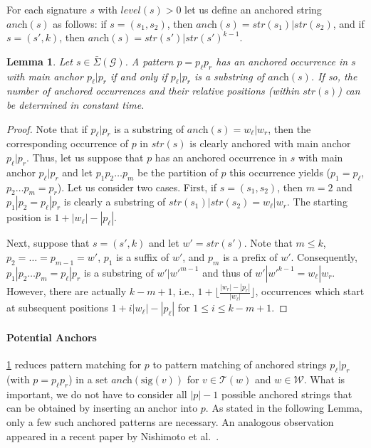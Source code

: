 \documentclass[a4paper]{article}
\newtheorem{lemma}[theorem]{Lemma}
\theoremstyle{remark}
\newcommand{\sigs}{\bar{\Sigma}}
\newcommand{\grammar}{\mathcal{G}}
\newcommand{\slev}{\textit{level}}
\newcommand{\sanch}{\textit{anch}}
\newcommand{\stree}{\mathcal{T}}
\newcommand{\sstr}{\textit{str}}
\newcommand{\ussig}{\mathrm{sig}}
\newcommand{\coll}{\mathcal{W}}
\begin{document}
For each signature $s$ with $\slev(s)>0$ let us define an anchored string $\sanch(s)$ as follows:
if $s=(s_1,s_2)$, then $\sanch(s)=\sstr(s_1)|\sstr(s_2)$, and if $s=(s',k)$, then $\sanch(s)=\sstr(s')|\sstr(s')^{k-1}$.
\begin{lemma}\label{lem:relanch}
  Let $s\in \sigs(\grammar)$.
A pattern $p=p_\ell p_r$ has an anchored occurrence in $s$ with main anchor $p_\ell|p_r$
if and only if $p_\ell|p_r$ is a substring of $\sanch(s)$. If so, the number of anchored occurrences and their relative positions (within $\sstr(s)$)
can be determined in constant time.
\end{lemma}
\begin{proof}
Note that if $p_\ell|p_r$ is a substring of $\sanch(s)=w_\ell|w_r$, then the corresponding occurrence of $p$ in $\sstr(s)$ is clearly anchored
with main anchor $p_\ell|p_r$.
Thus, let us suppose that $p$ has an anchored occurrence in $s$ with main anchor $p_\ell|p_r$ and let $p_1p_2\ldots p_m$ be the partition of $p$ this occurrence yields ($p_1=p_\ell$, $p_2\ldots p_m=p_r$).
Let us consider two cases.
First, if $s=(s_1,s_2)$, then $m=2$ and $p_1|p_2 = p_\ell|p_r$ is clearly a substring of $\sstr(s_1)|\sstr(s_2)=w_\ell|w_r$.
The starting position is $1+|w_\ell|-|p_\ell|$.

Next, suppose that $s=(s',k)$ and let $w'=\sstr(s')$. Note that $m\le k$, $p_2=\ldots=p_{m-1}=w'$, $p_1$ is a suffix of $w'$, and $p_m$ is a prefix of $w'$. Consequently, $p_1|p_2\ldots p_m = p_\ell | p_r$ is a substring of $w'|w'^{m-1}$ and thus of $w'|w'^{k-1}=w_\ell|w_r$.
However, there are actually $k-m+1$, i.e., $1+\lfloor{\frac{|w_r|-|p_r|}{|w_\ell|}}\rfloor$,
occurrences which start at subsequent positions $1+i|w_\ell|-|p_\ell|$ for $1\le i \le k-m+1$.
\end{proof}


\paragraph{Potential Anchors}
\cref{lem:relanch} reduces pattern matching for $p$ to pattern matching of anchored strings $p_\ell|p_r$ (with $p=p_\ell p_r$)
in a set $\sanch(\ussig(v))$ for $v\in \stree(w)$ and $w\in \coll$. What is important, we do not have to consider all $|p|-1$ possible anchored strings that can be obtained by inserting an anchor into $p$.
As stated in the following Lemma, only a few such anchored patterns are necessary.
An analogous observation appeared in a recent paper by Nishimoto et al.~\cite{DBLP:journals/corr/NishimotoIIBT15}.
\end{document}
